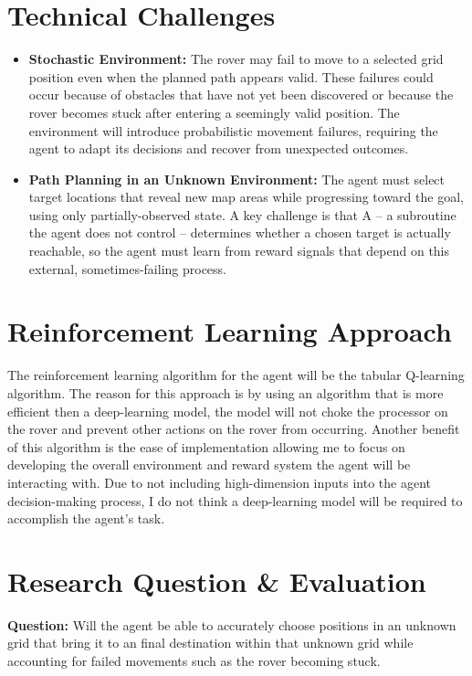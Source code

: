 \documentclass[12pt]{article}
\begin{document}
\section*{Technical Challenges}
\begin{itemize}
    \item \textbf{Stochastic Environment:} The rover may fail to move to a selected grid position even when the planned path appears valid.
    These failures could occur because of obstacles that have not yet been discovered or because the rover becomes stuck after entering a seemingly valid position.
    The environment will introduce probabilistic movement failures, requiring the agent to adapt its decisions and recover from unexpected outcomes.
    \item \textbf{Path Planning in an Unknown Environment:} The agent must select target locations that reveal new map areas while progressing toward the goal, using only partially-observed state.
    A key challenge is that A -- a subroutine the agent does not control -- determines whether a chosen target is actually reachable, so the agent must learn from reward signals that depend on this external, sometimes-failing process.
\end{itemize}
\section*{Reinforcement Learning Approach}
The reinforcement learning algorithm for the agent will be the tabular Q-learning algorithm.
The reason for this approach is by using an algorithm that is more efficient then a deep-learning model, the model will not choke the processor on the rover and prevent other actions on the rover from occurring.
Another benefit of this algorithm is the ease of implementation allowing me to focus on developing the overall environment and reward system the agent will be interacting with.
Due to not including high-dimension inputs into the agent decision-making process, I do not think a deep-learning model will be required to accomplish the agent's task.

\section*{Research Question \& Evaluation}
\textbf{Question:} Will the agent be able to accurately choose positions in an unknown grid that bring it to an final destination within that unknown grid while accounting for failed movements such as the rover becoming stuck.
\end{document}
